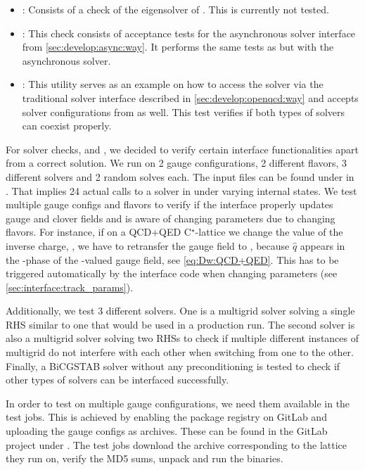 \begin{itemize}
  \item {}: Consists of a check of the eigensolver of \quda. This is currently not tested.
  \item {}: This check consists of acceptance tests for the asynchronous solver interface from \cref{sec:develop:async:way}. It performs the same tests as  but with the asynchronous solver.
  \item {}: This utility serves as an example on how to access the \quda solver via the traditional solver interface described in \cref{sec:develop:openqcd:way} and accepts solver configurations from \openqxd as well. This test verifies if both types of solvers can coexist properly.
\end{itemize}

For solver checks,  and , we decided to verify certain interface functionalities apart from a correct solution.
We run on \num{2} gauge configurations, \num{2} different flavors, \num{3} different solvers and \num{2} random solves each.
The input files can be found under  in \cite{gitlab:openqxd-devel}.
That implies \num{24} actual calls to a solver in \quda under varying internal states.
We test multiple gauge configs and flavors to verify if the interface properly updates gauge and clover fields and is aware of changing parameters due to changing flavors.
For instance, if on a QCD+QED C$^{\star}$-lattice we change the value of the inverse charge, , we have to retransfer the gauge field to \quda, because $\hat{q}$ appears in the -phase of the -valued gauge field, see \cref{eq:Dw:QCD+QED}.
This has to be triggered automatically by the interface code when changing parameters (see \cref{sec:interface:track_params}).

Additionally, we test \num{3} different solvers.
One is a multigrid solver solving a single RHS similar to one that would be used in a production run.
The second solver is also a multigrid solver solving two RHSs to check if multiple different instances of multigrid do not interfere with each other when switching from one to the other.
Finally, a BiCGSTAB solver without any preconditioning is tested to check if other types of solvers can be interfaced successfully.

In order to test on multiple gauge configurations, we need them available in the test jobs.
This is achieved by enabling the package registry on GitLab and uploading the gauge configs as  archives.
These can be found in the GitLab project under .
The test jobs download the archive corresponding to the lattice they run on, verify the MD5 sums, unpack and run the binaries.

